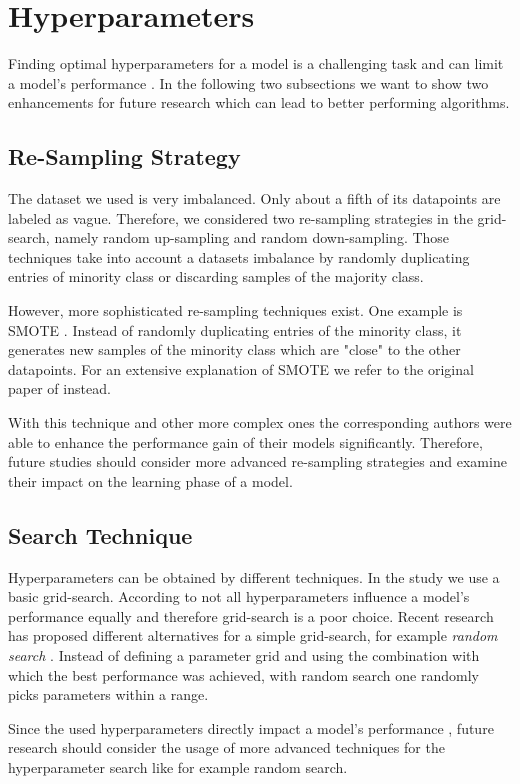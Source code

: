 \section{Hyperparameters}
\label{chp:future_work:sec:hyperparameters}
Finding optimal hyperparameters for a model is a challenging task and can limit a model's performance \parencite{Bergstra:2011,Zeiler:2012}.
In the following two subsections we want to show two enhancements for future research which can lead to better performing algorithms.

\subsection{Re-Sampling Strategy}
\label{chp:future_work:sec:hyperparameters:re_sampling_strategy}
The dataset we used is very imbalanced.
Only about a fifth of its datapoints are labeled as vague.
Therefore, we considered two re-sampling strategies in the grid-search, namely random up-sampling and random down-sampling.
Those techniques take into account a datasets imbalance by randomly duplicating entries of minority class or discarding samples of the majority class.

However, more sophisticated re-sampling techniques exist.
One example is \ac{SMOTE} \parencite{Chawla:2002}.
Instead of randomly duplicating entries of the minority class, it generates new samples of the minority class which are "close" to the other datapoints.
For an extensive explanation of \ac{SMOTE} we refer to the original paper of \textcite{Chawla:2002} instead.

With this technique and other more complex ones the corresponding authors were able to enhance the performance gain of their models significantly.
Therefore, future studies should consider more advanced re-sampling strategies and examine their impact on the learning phase of a model.

\subsection{Search Technique}
\label{chp:future_work:sec:hyperparameters:search_technique}
Hyperparameters can be obtained by different techniques.
In the study we use a basic grid-search.
According to \textcite{Bergstra:2012} not all hyperparameters influence a model's performance equally and therefore grid-search is a poor choice.
Recent research has proposed different alternatives for a simple grid-search, for example \textit{random search} \parencite{Bergstra:2012}.
Instead of defining a parameter grid and using the combination with which the best performance was achieved, with random search one randomly picks parameters within a range.

Since the used hyperparameters directly impact a model's performance \parencite{Claesen:2015}, future research should consider the usage of more advanced techniques for the hyperparameter search like for example random search.
